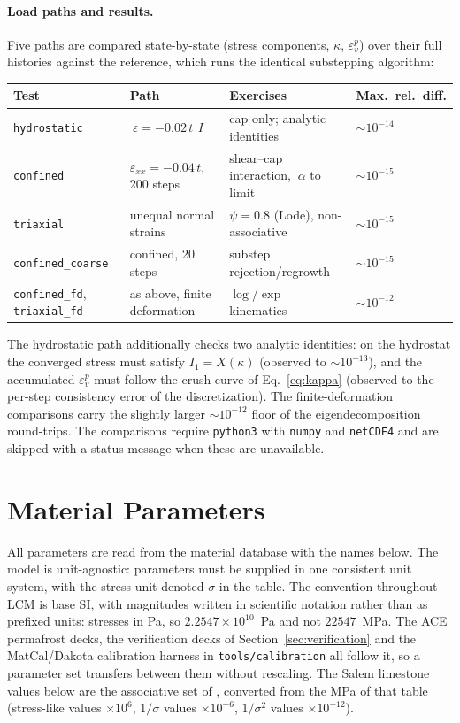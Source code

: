 \documentclass[12pt]{article}
\newcommand{\backstress}{~\alpha}
\newcommand{\ident}{~I}
\begin{document}
\paragraph{Load paths and results.}
Five paths are compared state-by-state (stress components, $\kappa$,
$\varepsilon_v^p$) over their full histories against the reference,
which runs the identical substepping algorithm:
\begin{center}
\small
\begin{tabular}{lp{3.4cm}p{4.4cm}l}
\toprule
Test & Path & Exercises & Max.\ rel.\ diff. \\
\midrule
\texttt{hydrostatic} & $~\varepsilon = -0.02\,t\,\ident$ &
  cap only; analytic identities & $\sim 10^{-14}$ \\
\texttt{confined} & $\varepsilon_{xx} = -0.04\,t$, 200 steps &
  shear--cap interaction, $\backstress$ to limit & $\sim 10^{-15}$ \\
\texttt{triaxial} & unequal normal strains &
  $\psi = 0.8$ (Lode), non-associative & $\sim 10^{-15}$ \\
\texttt{confined\_coarse} & confined, 20 steps &
  substep rejection/regrowth & $\sim 10^{-15}$ \\
\texttt{confined\_fd}, \texttt{triaxial\_fd} & as above, finite deformation &
  $\log$/$\exp$ kinematics & $\sim 10^{-12}$ \\
\bottomrule
\end{tabular}
\end{center}
The hydrostatic path additionally checks two analytic identities: on
the hydrostat the converged stress must satisfy $I_1 = X(\kappa)$
(observed to $\sim 10^{-13}$), and the accumulated
$\varepsilon_v^p$ must follow the crush curve of
Eq.~\eqref{eq:kappa} (observed to the per-step consistency error of
the discretization). The finite-deformation comparisons carry the
slightly larger $\sim 10^{-12}$ floor of the eigendecomposition
round-trips. The comparisons require \texttt{python3} with
\texttt{numpy} and \texttt{netCDF4} and are skipped with a status
message when these are unavailable.

\section{Material Parameters}
\label{sec:parameters}

All parameters are read from the material database with the names
below. The model is unit-agnostic: parameters must be supplied in one
consistent unit system, with the stress unit denoted $\sigma$ in the
table. The convention throughout LCM is base SI, with magnitudes
written in scientific notation rather than as prefixed units: stresses
in Pa, so $2.2547 \times 10^{10}$~Pa and not $22547$~MPa. The ACE
permafrost decks, the verification decks of
Section~\ref{sec:verification} and the MatCal/Dakota calibration
harness in \texttt{tools/calibration} all follow it, so a parameter
set transfers between them without rescaling. The Salem limestone values
below are the associative set of
\citet[Table~1]{Sun.Chen.Ostien:2014}, converted from the MPa of that
table (stress-like values $\times 10^{6}$, $1/\sigma$ values
$\times 10^{-6}$, $1/\sigma^2$ values $\times 10^{-12}$).
\end{document}
